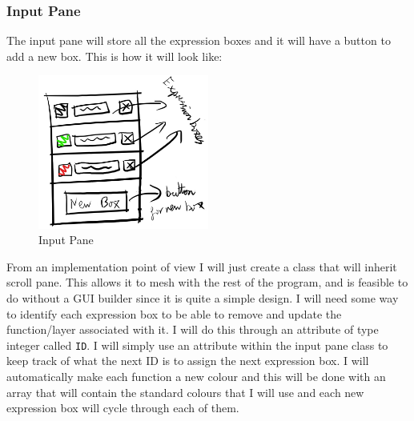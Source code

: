 \documentclass[../../../../main.tex]{subfiles}
\begin{document}
\subsubsection{Input Pane}
The input pane will store all the expression boxes and it will have a button to add a new box. This is how it will look like:
\begin{figure}[H]
	\centering
	\includegraphics[width=0.5\textwidth]{images/inputPane}
	\caption{Input Pane}
\end{figure}
From an implementation point of view I will just create a class that will inherit scroll pane. This allows it to mesh with the rest of the program, and is feasible to do without a GUI builder since it is quite a simple design. I will need some way to identify each expression box to be able to remove and update the function/layer associated with it. I will do this through an attribute of type integer called \texttt{ID}. I will simply use an attribute within the input pane class to keep track of what the next ID is to assign the next expression box. I will automatically make each function a new colour and this will be done with an array that will contain the standard colours that I will use and each new expression box will cycle through each of them.\\
\newpage
\end{document}
